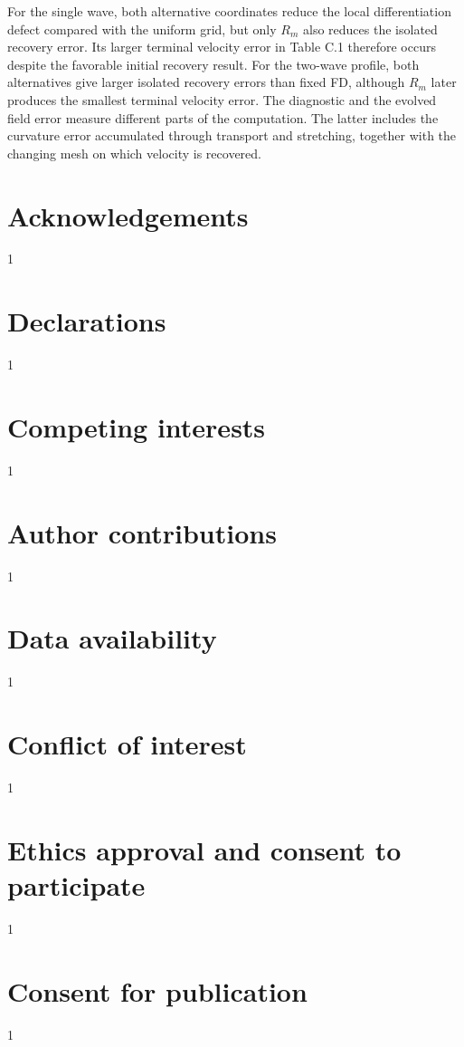 \documentclass{article}
\begin{document}
For the single wave, both alternative coordinates reduce the local differentiation defect compared with the uniform grid, but only \(R_m\) also reduces the isolated recovery error. Its larger terminal velocity error in Table C.1 therefore occurs despite the favorable initial recovery result. For the two-wave profile, both alternatives give larger isolated recovery errors than fixed FD, although \(R_m\) later produces the smallest terminal velocity error. The diagnostic and the evolved field error measure different parts of the computation. The latter includes the curvature error accumulated through transport and stretching, together with the changing mesh on which velocity is recovered.




\section*{Acknowledgements}
1

\section*{Declarations}
1

\section*{Competing interests}
1

\section*{Author contributions}
1

\section*{Data availability}
1

\section*{Conflict of interest}
1

\section*{Ethics approval and consent to participate}
1

\section*{Consent for publication}
1
\end{document}
